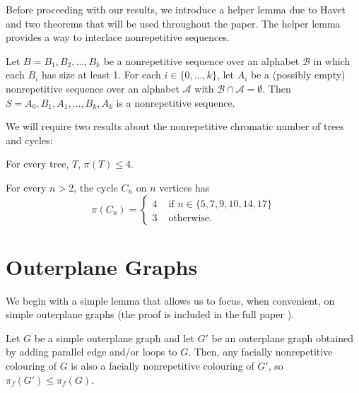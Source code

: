 \documentclass{cccg16}
\begin{document}
Before proceeding with our results, we introduce a helper lemma
due to Havet \etal~\cite{havet2011facial} and two theorems that
will be used throughout the paper. The helper lemma provides a way to
interlace nonrepetitive sequences.

\begin{lem}
  Let $B=B_1,B_2,\ldots,B_k$ be a nonrepetitive sequence over an alphabet
  $\mathcal{B}$ in which each $B_i$ has size at least 1. For each $i
  \in \{0,\ldots,k\}$, let $A_i$ be a (possibly empty) nonrepetitive
  sequence over an alphabet $\mathcal{A}$ with $\mathcal{B} \cap
  \mathcal{A} = \emptyset$. Then $S = A_0, B_1, A_1, \ldots, B_k, A_k$
  is a nonrepetitive sequence.
\end{lem}

We will require two results about the nonrepetitive chromatic number of
trees and cycles:

\begin{thm}
  For every tree, $T$, $\pi(T) \leq 4$.
\end{thm}

\begin{thm}
  For every $n>2$, the cycle $C_n$ on $n$ vertices has
  \[
  \pi(C_n) = \begin{cases}
              4 & \text{ if } n \in \{5,7,9,10,14,17\} \\
              3 & \text{ otherwise. }
             \end{cases}
  \]
\end{thm}

\section{Outerplane Graphs}

We begin with a simple lemma that allows us to focus, when convenient,
on simple outerplane graphs (the proof is included in the full paper
\cite{bose.dujmovic.ea:new}).

\begin{lem}
  Let $G$ be a simple outerplane graph and let $G'$ be an outerplane
  graph obtained by adding parallel edge and/or loops to $G$.  Then, any
  facially nonrepetitive colouring of $G$ is also a facially nonrepetitive
  colouring of $G'$, so $\pi_f(G')\le \pi_f(G)$.
\end{lem}
\end{document}
